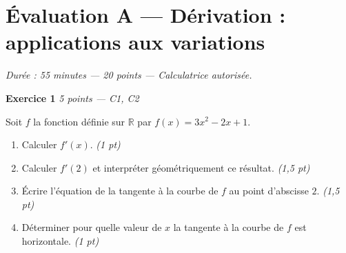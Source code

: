 
\section*{Évaluation A — Dérivation : applications aux variations}

\textit{Durée : 55 minutes — 20 points — Calculatrice autorisée.}

\bigskip

\textbf{Exercice 1} \hfill \textit{5 points — C1, C2}

Soit $f$ la fonction définie sur $\mathbb{R}$ par $f(x) = 3x^2 - 2x + 1$.

\begin{enumerate}
  \item Calculer $f'(x)$. \hfill \textit{(1 pt)}
  \item Calculer $f'(2)$ et interpréter géométriquement ce résultat. \hfill \textit{(1,5 pt)}
  \item Écrire l'équation de la tangente à la courbe de $f$ au point d'abscisse $2$. \hfill \textit{(1,5 pt)}
  \item Déterminer pour quelle valeur de $x$ la tangente à la courbe de $f$ est horizontale. \hfill \textit{(1 pt)}
\end{enumerate}


